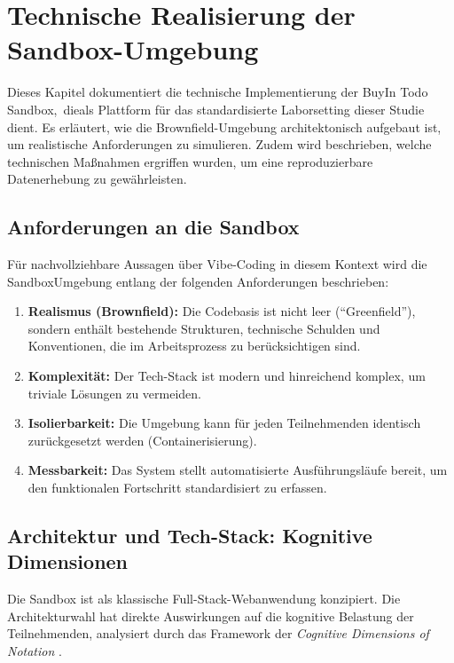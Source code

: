 \chapter{Technische Realisierung der Sandbox-Umgebung}
\label{chap:implementierung}

Dieses Kapitel dokumentiert die technische Implementierung der BuyIn Todo Sandbox,~die\linebreak als Plattform für das standardisierte Laborsetting dieser Studie dient. Es erläutert, wie die Brownfield-Umgebung architektonisch aufgebaut ist, um realistische Anforderungen zu simulieren. Zudem wird beschrieben, welche technischen Maßnahmen ergriffen wurden, um eine reproduzierbare Datenerhebung zu gewährleisten.

\section{Anforderungen an die Sandbox}

Für nachvollziehbare Aussagen über Vibe-Coding in diesem Kontext wird die SandboxUmgebung entlang der folgenden Anforderungen beschrieben:

\begin{enumerate}
    \item  \textbf{Realismus (Brownfield):} Die Codebasis ist nicht leer (\enquote{Greenfield}), sondern enthält bestehende Strukturen, technische Schulden und Konventionen, die im Arbeitsprozess zu berücksichtigen sind.
    \item  \textbf{Komplexität:} Der Tech-Stack ist modern und hinreichend komplex, um triviale Lösungen zu vermeiden.
    \item  \textbf{Isolierbarkeit:} Die Umgebung kann für jeden Teilnehmenden identisch zurückgesetzt werden (Containerisierung).
    \item  \textbf{Messbarkeit:} Das System stellt automatisierte Ausführungsläufe bereit, um den funktionalen Fortschritt standardisiert zu erfassen.
\end{enumerate}

\section{Architektur und Tech-Stack: Kognitive Dimensionen}

Die Sandbox ist als klassische Full-Stack-Webanwendung konzipiert. Die Architekturwahl hat direkte Auswirkungen auf die kognitive Belastung der Teilnehmenden, analysiert durch das Framework der \emph{Cognitive Dimensions of Notation} \parencite{green1989cognitive}.


